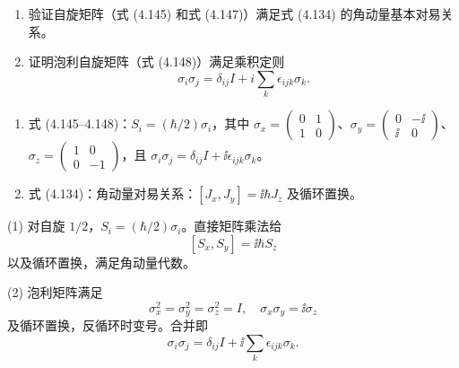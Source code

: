 \begin{question}
\begin{enumerate}
\item 验证自旋矩阵（式 (4.145) 和式 (4.147)）满足式 (4.134) 的角动量基本对易关系。
\item 证明泡利自旋矩阵（式 (4.148)）满足乘积定则
\[
\sigma_i\sigma_j=\delta_{ij}I+i\sum_k\epsilon_{ijk}\sigma_k.
\]
\end{enumerate}

\par\smallskip
{}
\begin{enumerate}[leftmargin=2.2em,itemsep=0.12em,topsep=0.12em,parsep=0pt]
\item 式 (4.145--4.148)：$S_i=(\hbar/2)\sigma_i$，其中 $\sigma_x=\begin{pmatrix}0&1\\1&0\end{pmatrix}$、$\sigma_y=\begin{pmatrix}0&-\ii\\\ii&0\end{pmatrix}$、$\sigma_z=\begin{pmatrix}1&0\\0&-1\end{pmatrix}$，且 $\sigma_i\sigma_j=\delta_{ij}I+\ii\epsilon_{ijk}\sigma_k$。
\item 式 (4.134)：角动量对易关系：$[J_x,J_y]=\ii\hbar J_z$ 及循环置换。
\end{enumerate}

\end{question}
\begin{solution}

(1) 对自旋 $1/2$，$S_i=(\hbar/2)\sigma_i$。直接矩阵乘法给
\[
[S_x,S_y]=\ii\hbar S_z
\]
以及循环置换，满足角动量代数。

(2) 泡利矩阵满足
\[
\sigma_x^2=\sigma_y^2=\sigma_z^2=I,
\quad \sigma_x\sigma_y=\ii\sigma_z
\]
及循环置换，反循环时变号。合并即
\[
\sigma_i\sigma_j=\delta_{ij}I+\ii\sum_k\epsilon_{ijk}\sigma_k.
\]

\end{solution}

